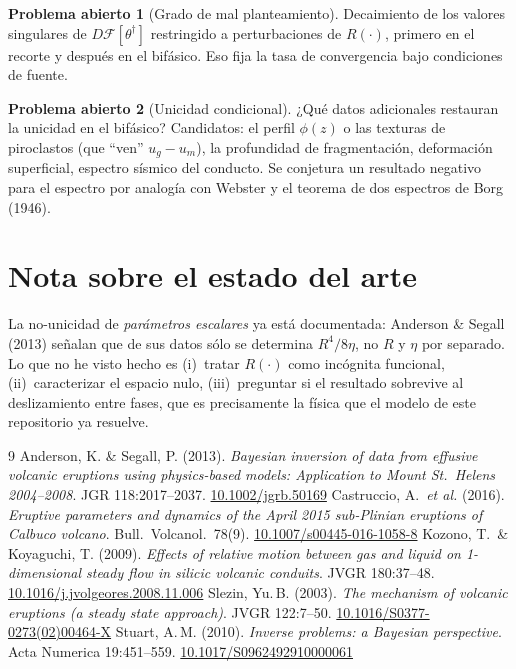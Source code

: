 \documentclass[11pt,a4paper]{article}
\theoremstyle{plain}
\theoremstyle{definition}
\newtheorem{problema}{Problema abierto}
\theoremstyle{remark}
\begin{document}
\begin{problema}[Grado de mal planteamiento]
Decaimiento de los valores singulares de $D\mathcal{F}[\theta^\dagger]$
restringido a perturbaciones de $R(\cdot)$, primero en el recorte y después
en el bifásico. Eso fija la tasa de convergencia bajo condiciones de fuente.
\end{problema}

\begin{problema}[Unicidad condicional]
¿Qué datos adicionales restauran la unicidad en el bifásico? Candidatos: el
perfil $\phi(z)$ o las texturas de piroclastos (que ``ven'' $u_g-u_m$), la
profundidad de fragmentación, deformación superficial, espectro sísmico del
conducto. Se conjetura un resultado negativo para el espectro por analogía
con Webster y el teorema de dos espectros de Borg (1946).
\end{problema}

\section*{Nota sobre el estado del arte}

La no-unicidad de \emph{parámetros escalares} ya está documentada: Anderson
\& Segall (2013) señalan que de sus datos sólo se determina $R^4/8\eta$, no
$R$ y $\eta$ por separado. Lo que no he visto hecho es (i)~tratar $R(\cdot)$
como incógnita funcional, (ii)~caracterizar el espacio nulo, (iii)~preguntar
si el resultado sobrevive al deslizamiento entre fases, que es precisamente
la física que el modelo de este repositorio ya resuelve.

\begin{thebibliography}{9}\small
{} Anderson, K. \& Segall, P. (2013).
  \emph{Bayesian inversion of data from effusive volcanic eruptions using
  physics-based models: Application to Mount St.\ Helens 2004--2008}.
  JGR 118:2017--2037. \href{https://doi.org/10.1002/jgrb.50169}{10.1002/jgrb.50169}
 Castruccio, A.\ \emph{et al.} (2016).
  \emph{Eruptive parameters and dynamics of the April 2015 sub-Plinian eruptions
  of Calbuco volcano}. Bull.\ Volcanol.\ 78(9).
  \href{https://doi.org/10.1007/s00445-016-1058-8}{10.1007/s00445-016-1058-8}
 Kozono, T.\ \& Koyaguchi, T. (2009).
  \emph{Effects of relative motion between gas and liquid on 1-dimensional
  steady flow in silicic volcanic conduits}. JVGR 180:37--48.
  \href{https://doi.org/10.1016/j.jvolgeores.2008.11.006}{10.1016/j.jvolgeores.2008.11.006}
 Slezin, Yu.\,B. (2003).
  \emph{The mechanism of volcanic eruptions (a steady state approach)}.
  JVGR 122:7--50.
  \href{https://doi.org/10.1016/S0377-0273(02)00464-X}{10.1016/S0377-0273(02)00464-X}
 Stuart, A.\,M. (2010). \emph{Inverse problems: a Bayesian
  perspective}. Acta Numerica 19:451--559.
  \href{https://doi.org/10.1017/S0962492910000061}{10.1017/S0962492910000061}
\end{thebibliography}
\end{document}

